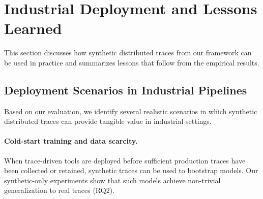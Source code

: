 \documentclass[sigconf,review]{acmart}
\begin{document}




\section{Industrial Deployment and Lessons Learned}
\label{sec:industry}
This section discusses how synthetic distributed traces from our framework can be used in practice and summarizes lessons that follow from the empirical results.


\subsection{Deployment Scenarios in Industrial Pipelines}

Based on our evaluation, we identify several realistic scenarios in which synthetic distributed traces can provide tangible value in industrial settings.

\paragraph{Cold-start training and data scarcity.}
When trace-driven tools are deployed before sufficient production traces have been collected or retained, synthetic traces can be used to bootstrap models. Our synthetic-only experiments show that such models achieve non-trivial generalization to real traces (RQ2).
\end{document}
